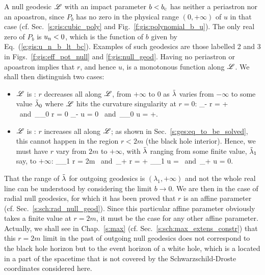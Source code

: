 A null geodesic $\mathscr{L}$ with an impact parameter $b < b_{\rm c}$ has neither
a periastron nor an apoastron, since $P_b$ has no zero in the physical range
$(0, +\infty)$ of $u$ in that
case (cf. Sec.~\ref{s:gis:cubic_poly} and Fig.~\ref{f:gis:polynomial_b_u}).
The only real zero of $P_b$ is $u_{\rm n}<0$, which is the function of $b$
given by Eq.~(\ref{e:gis:u_n_b_lt_bc}).
Examples of such geodesics are those labelled 2 and 3
in Figs.~\ref{f:gis:eff_pot_null} and \ref{f:gis:null_geod}.
Having no periastron or apoastron implies that $r$, and hence $u$, is a
monotonous function along $\mathscr{L}$.
We shall then distinguish two cases:
\begin{itemize}
\item $\mathscr{L}$ is : $r$ decreases all along $\mathscr{L}$, from $+\infty$ to $0$ as ${\tilde\lambda}$
varies from $-\infty$ to some value ${\tilde\lambda}_0$ where $\mathscr{L}$ hits the curvature
singularity at $r=0$:
\be
    \lim_{\tlamb\to -\infty} r = + \infty
    \ \mbox{and}\
    \lim_{\tlamb\to \tlamb_0} r = 0
    \quad \iff\quad
    \lim_{\tlamb\to -\infty} u = 0
    \ \mbox{and}\
    \lim_{\tlamb\to \tlamb_0} u = +\infty.
\ee
\item $\mathscr{L}$ is : $r$ increases all along $\mathscr{L}$; as shown in Sec.~\ref{s:ges:eq_to_be_solved}, this cannot happen in the region $r<2m$ (the black
hole interior). Hence, we must have $r$ vary from $2m$ to $+\infty$,
with ${\tilde\lambda}$ ranging from some finite value, ${\tilde\lambda}_1$ say, to $+\infty$:
\be
    \lim_{\tlamb\to \tlamb_1} r = 2m
    \ \mbox{and}\
    \lim_{\tlamb\to +\infty} r = +\infty
    \quad \iff\quad
    \lim_{\tlamb\to \tlamb_1} u = 
    \ \mbox{and}\
    \lim_{\tlamb\to +\infty} u = 0.
\ee
\end{itemize}
That the range of ${\tilde\lambda}$ for outgoing geodesics is $(\lambda_1, +\infty)$
and not the whole real line can be understood by considering the limit
$b\to 0$. We are then in the case of radial null geodesics, for which it has
been proved that $r$ is an affine parameter (cf. Sec.~\ref{s:sch:rad_null_geod}).
Since this particular affine parameter obviously takes a finite value at $r=2m$, it
must be the case for any other affine parameter.
Actually, we shall see in Chap.~\ref{s:max} (cf. Sec.~\ref{s:sch:max_extens_constr})
that this $r=2m$ limit in the
past of outgoing null geodesics does not correspond to the black hole horizon
but to the event horizon of a white hole, which is a located in a part of
the spacetime that is not covered by the Schwarzschild-Droste coordinates
considered here.

